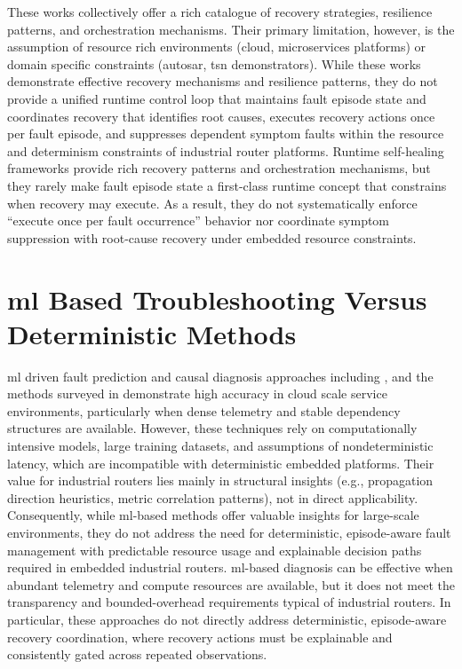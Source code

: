 These works collectively offer a rich catalogue of recovery strategies, resilience patterns, and orchestration mechanisms. Their primary limitation, however, is the assumption of resource rich environments (cloud, microservices platforms) or domain specific constraints (\gls{autosar}, \gls{tsn} demonstrators). While these works demonstrate effective recovery mechanisms and resilience patterns, they do not provide a unified runtime control loop that maintains fault episode state and coordinates recovery that identifies root causes, executes recovery actions once per fault episode, and suppresses dependent symptom faults within the resource and determinism constraints of industrial router platforms. Runtime self-healing frameworks provide rich recovery patterns and orchestration mechanisms, but they rarely make fault episode state a first-class runtime concept that constrains when recovery may execute. As a result, they do not systematically enforce “execute once per fault occurrence” behavior nor coordinate symptom suppression with root-cause recovery under embedded resource constraints.

\section{\gls{ml} Based Troubleshooting Versus Deterministic Methods}\label{sec:lit-ml-vs-deterministic}

\gls{ml} driven fault prediction and causal diagnosis approaches including \cite{ref27,ref28}, and the methods surveyed in \cite{ref6} demonstrate high accuracy in cloud scale service environments, particularly when dense telemetry and stable dependency structures are available. However, these techniques rely on computationally intensive models, large training datasets, and assumptions of nondeterministic latency, which are incompatible with deterministic embedded platforms. Their value for industrial routers lies mainly in structural insights (e.g., propagation direction heuristics, metric correlation patterns), not in direct applicability. Consequently, while \gls{ml}-based methods offer valuable insights for large-scale environments, they do not address the need for deterministic, episode-aware fault management with predictable resource usage and explainable decision paths required in embedded industrial routers. \gls{ml}-based diagnosis can be effective when abundant telemetry and compute resources are available, but it does not meet the transparency and bounded-overhead requirements typical of industrial routers. In particular, these approaches do not directly address deterministic, episode-aware recovery coordination, where recovery actions must be explainable and consistently gated across repeated observations.

